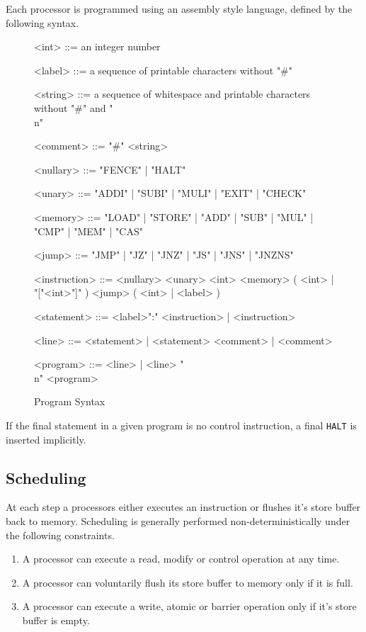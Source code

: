 Each processor is programmed using an assembly style language, defined by the following syntax.

\begin{figure}[h]
\begin{grammar}
\small

<int> ::= an integer number

<label> ::= a sequence of printable characters without "#"

<string> ::= a sequence of whitespace and printable characters without "#" and "\\n"

<comment> ::= "#" <string>

<nullary> ::= "FENCE" | "HALT"

<unary> ::= "ADDI" | "SUBI" | "MULI" | "EXIT" | "CHECK"

<memory> ::= "LOAD" | "STORE" | "ADD" | "SUB" | "MUL" | "CMP" | "MEM" | "CAS"

<jump> ::= "JMP" | "JZ" | "JNZ" | "JS" | "JNS" | "JNZNS"

<instruction> ::= <nullary>
\alt <unary> <int>
\alt <memory> ( <int> | "["<int>"]" )
\alt <jump> ( <int> | <label> )

<statement> ::= <label>":" <instruction> | <instruction>

<line> ::= <statement> | <statement> <comment> | <comment>

<program> ::= <line> | <line> "\\n" <program>
\end{grammar}
\caption{Program Syntax}
\label{fig:syntax:program}
\end{figure}

If the final statement in a given program is no control instruction, a final \texttt{HALT} is inserted implicitly.

\subsection{Scheduling}

At each step a processors either executes an instruction or flushes it's store buffer back to memory.
Scheduling is generally performed non-deterministically under the following constraints.

\begin{enumerate}
  \item A processor can execute a read, modify or control operation at any time.
  \item A processor can voluntarily flush its store buffer to memory only if it is full.
  \item A processor can execute a write, atomic or barrier operation only if it's store buffer is empty.
\end{enumerate}

